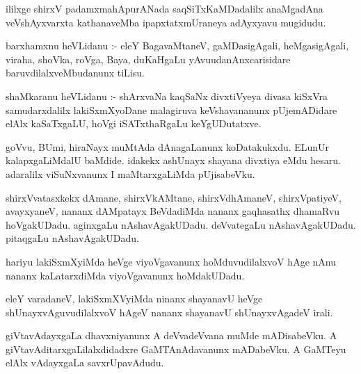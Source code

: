 \documentclass{article}
\begin{document}
\begin{mn}
ililxge  shirxV padamxmahApurANada  saqSiTxKaMDadalilx  anaMgadAna  veVshAyxvarxta  kathanaveMba  
ipapxtatxmUraneya  adAyxyavu  mugidudu.
\end{mn}




\begin{mn}
barxhamxnu  heVLidanu :- eleY  BagavaMtaneV,  gaMDasigAgali,  heMgasigAgali,  viraha,  shoVka,  
roVga,  Baya,  duKaHgaLu  yAvuudanAnxcarisidare  baruvdilalxveMbudanunx  tiLisu.
\end{mn}

\begin{mn}
shaMkaranu  heVLidanu :- shArxvaNa  kaqSaNx  divxtiVyeya  divasa  kiSxVra  samudarxdalilx  lakiSxmXyoDane  
malagiruva  keVshavananunx  pUjemADidare  elAlx  kaSaTxgaLU,  hoVgi  iSATxthaRgaLu  keYgUDutatxve. 
\end{mn}

\begin{mn}
goVvu,  BUmi,  hiraNayx  muMtAda  dAnagaLanunx  koDatakukxdu.  ELunUr  kalapxgaLiMdalU  baMdide.  idakekx  
ashUnayx  shayana  divxtiya  eMdu  hesaru.  adaralilx  viSuNxvanunx  I  maMtarxgaLiMda  pUjisabeVku.
\end{mn}

\begin{mn}
shirxVvatasxkekx dAmane,  shirxVkAMtane,  shirxVdhAmaneV,  shirxVpatiyeV,  avayxyaneV,  nananx  
dAMpatayx  BeVdadiMda  nananx  gaqhasathx  dhamaRvu  hoVgakUDadu.  aginxgaLu  nAshavAgakUDadu.  
deVvategaLu  nAshavAgakUDadu.  pitaqgaLu  nAshavAgakUDadu.
\end{mn}

\begin{mn}
hariyu  lakiSxmXyiMda  heVge  viyoVgavanunx  hoMduvudilalxvoV  hAge  nAnu  nananx  kaLatarxdiMda  
viyoVgavanunx  hoMdakUDadu.
\end{mn}

\begin{mn}
eleY  varadaneV,  lakiSxmXVyiMda  ninanx  shayanavU  heVge  shUnayxvAguvudilalxvoV  hAgeV  nananx  
shayanavU  shUnayxvAgadeV  irali.
\end{mn}

\begin{mn}
giVtavAdayxgaLa  dhavxniyanunx  A  deVvadeVvana  muMde  mADisabeVku.  A  giVtavAditarxgaLilalxdidadxre  
GaMTAnAdavanunx  mADabeVku.  A  GaMTeyu  elAlx  vAdayxgaLa  savxrUpavAdudu.
\end{mn}
\end{document}
